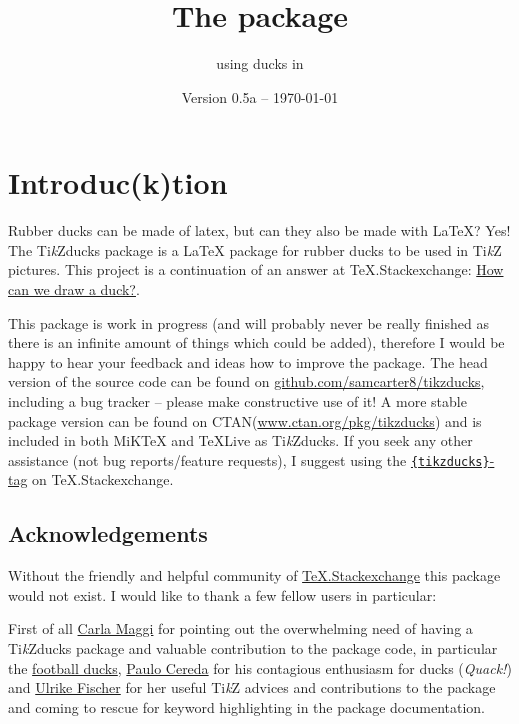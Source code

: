 \documentclass[parskip=half]{scrartcl}
\title{The \texorpdfstring{\tikzducks}{tikzducks} package}
\subtitle{using ducks in \TikZ}
\author{%
	\texorpdfstring{\texttt{samcarter} (alias 
		\begin{tikzpicture}[scale=0.3,baseline=3pt]
			\duck[body=yellow!50!brown!50!white,
					longhair=red!50!brown, 
					jacket=blue!50!black]
		\end{tikzpicture})\\[0.8em]
		\url{https://github.com/samcarter8/tikzducks}\\
		\url{https://www.ctan.org/pkg/tikzducks}
	}{samcarter}}
\date{Version 0.5a -- \today}
\newcommand{\CTAN}{\textsc{CTAN}\xspace}
\newcommand{\TikZ}{Ti\emph{k}Z\xspace}
\newcommand{\tikzducks}{Ti\emph{k}Zducks\xspace}
\newcommand{\miktex}{MiK\TeX\xspace}
\newcommand{\texlive}{\TeX{}Live\xspace}
\begin{document}
\maketitle
\thispagestyle{scrheadings}

\section{Introduc(k)tion}
\label{intro}

Rubber ducks can be made of latex, but can they also be made with \LaTeX? Yes! The \tikzducks package is a \LaTeX{} package for rubber ducks to be used in \TikZ pictures. 
This project is a continuation of an answer at TeX.Stackexchange: \href{tex.stackexchange.com/a/347458/36296}{How can we draw a duck?}.

This package is work in progress (and will probably never be really finished as there is an infinite amount of things which could be added), therefore I would be happy to hear your feedback and ideas how to improve the package. 
The head version of the source code can be found on \url{github.com/samcarter8/tikzducks}, including a bug tracker -- please make constructive use of it! A more stable package version can be found on \CTAN (\url{www.ctan.org/pkg/tikzducks}) and is included in both \miktex and \texlive as \tikzducks. If you seek any other assistance (not bug reports/feature requests), I suggest using the \href{https://tex.stackexchange.com/questions/tagged/tikzducks}{\texttt{\{tikzducks\}}-tag} on TeX.Stackexchange.

\subsection{Acknowledgements}

Without the friendly and helpful community of \href{https://tex.stackexchange.com/}{TeX.Stackexchange} this package would not exist. I would like to thank a few fellow users in particular:

First of all 
%
\href{https://tex.stackexchange.com/users/101651/carlatex}{Carla Maggi} for pointing out the overwhelming need of having a \tikzducks package and valuable contribution to the package code, in particular the \hyperref[sec:footballducks]{football ducks},
%
\href{https://tex.stackexchange.com/users/3094/paulo-cereda}{Paulo Cereda} for his contagious enthusiasm for ducks (\emph{Quack!}) and
%
\href{https://tex.stackexchange.com/users/2388/ulrike-fischer}{Ulrike Fischer} for her useful \TikZ advices and contributions to the package and coming to rescue for keyword highlighting in the package documentation.
\end{document}
